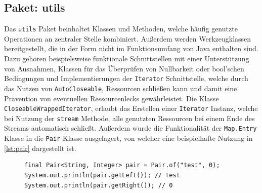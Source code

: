 \subsection{Paket: utils}
Das \texttt{utils} Paket beinhaltet Klassen und Methoden, welche häufig genutzte Operationen an zentraler Stelle kombiniert. Außerdem werden Werkzeugklassen bereitgestellt, die in der Form nicht im Funktionsumfang von Java enthalten sind. Dazu gehören beispielsweise funktionale Schnittstellen mit einer Unterstützung von Ausnahmen, Klassen für das Überprüfen von Nullbarkeit oder bool'schen Bedingungen und Implementierungen der \texttt{Iterator} Schnittstelle, welche durch das Nutzen von \texttt{AutoCloseable}, Ressourcen schließen kann und damit eine Prävention von eventuellen Ressourcenlecks gewährleistet. Die Klasse \texttt{CloseableWrappedIterator}, erlaubt das Erstellen einer \texttt{Iterator} Instanz, welche bei Nutzung der \texttt{stream} Methode, alle genutzten Ressourcen bei einem Ende des Streams automatisch schließt. Außerdem wurde die Funktionalität der \texttt{Map.Entry} Klasse in die \texttt{Pair} Klasse ausgelagert, von welcher eine beispielhafte Nutzung in \autoref{lst:pair} dargestellt ist.
\begin{figure}[H]
	\begin{lstlisting}[caption=Beispiel -- Nutzung der \texttt{Pair} Klasse., captionpos=b, label=lst:pair]
final Pair<String, Integer> pair = Pair.of("test", 0);
System.out.println(pair.getLeft()); // test
System.out.println(pair.getRight()); // 0
	\end{lstlisting}
\end{figure}
